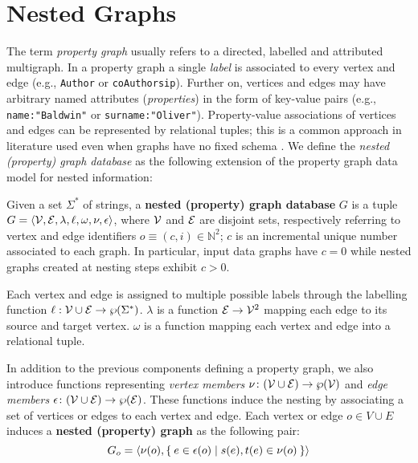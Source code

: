 
\section{Nested Graphs}
\label{sec:model}
The term \textit{property graph}  \cite{angles12} usually refers to a directed, labelled and attributed multigraph. 
In a property graph a single \textit{label}  is associated to every vertex and edge (e.g., \texttt{Author} or \texttt{coAuthorsip}). Further on, vertices and edges may have arbitrary named attributes (\textit{properties}) in the form of key-value pairs (e.g., \texttt{name:"Baldwin"} or \texttt{surname:"Oliver"}). Property-value associations of vertices and edges can be represented by relational tuples; this is a common approach in literature used even when graphs have no fixed schema \cite{angles12}. We define the\textit{ nested (property) graph database} as the following extension of the property graph data model for nested information:

\begin{definition}
Given a set $\Sigma^*$ of strings,
	a \textbf{nested (property) graph database} $G$ is a tuple $G=\Braket{\mathcal{V}, \mathcal{E}, \lambda,\ell,\omega,\nu,\epsilon}$, where $\mathcal{V}$ and $\mathcal{E}$ are disjoint sets, respectively referring to vertex and edge identifiers $o\equiv(c,i)\in\mathbb{N}^2$; $c$ is an incremental unique number associated to each graph. In particular, input data graphs have $c=0$ while  nested graphs created at nesting steps exhibit $c>0$. 
	
	Each vertex and edge is assigned to multiple possible labels through the labelling function $\ell:\mathcal{V}\cup \mathcal{E}\to \wp(\Sigma^*)$. $\lambda$ is a function $\mathcal{E}\to \mathcal{V}^2$ mapping each edge to its source and target vertex. $\omega$ is a function mapping each vertex and edge into a relational tuple.
	
	In addition to the previous components defining a property graph, we also introduce functions representing \textit{vertex members} $\nu\colon (\mathcal{V}\cup \mathcal{E})\to\wp(\mathcal{V})$ and \textit{edge members} $\epsilon\colon(\mathcal{V}\cup \mathcal{E})\to \wp(\mathcal{E})$. These functions induce the nesting by associating a set of vertices or edges to each vertex and edge. Each vertex or edge $o\in V\cup E$ induces a \textbf{nested (property) graph} as the following pair:
	\[G_o=\Braket{\nu(o),\Set{e\in\epsilon(o)|s(e),t(e)\in\nu(o)}}\]
\end{definition}


